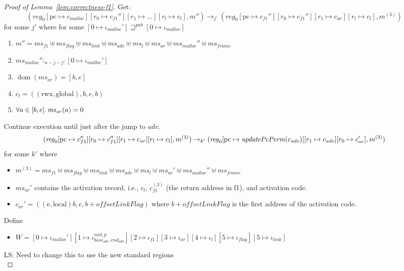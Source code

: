 \documentclass[a4paper]{article}
\newcommand{\update}[2]{[#1 \mapsto #2]}
\DeclareMathOperator{\dom}{dom}
\newcommand\lau[1]{{\color{purple} \sf \footnotesize {LS: #1}}\\}
\newcommand{\var}[1]{\mathit{#1}}
\newcommand{\hs}{\var{ms}}
\newcommand{\ms}{\hs}
\newcommand{\pcreg}{\mathrm{pc}}
\newcommand{\start}{\var{base}}
\newcommand{\addrend}{\var{end}}
\newcommand{\reg}{\var{reg}}
\newcommand{\heap}{\var{mem}}
\newcommand{\adv}{\var{adv}}
\newcommand{\link}{\var{link}}
\newcommand{\flag}{\var{flag}}
\newcommand{\nwl}{\var{nwl}}
\newcommand{\olf}{\var{offsetLinkFlag}}
\newcommand{\plainfun}[2]{
  \ifthenelse{\equal{#2}{}}
  {\mathit{#1}}
  {\mathit{#1}(#2)}
}
\newcommand{\updatePcPerm}[1]{\plainfun{updatePcPerm}{#1}}
\newcommand{\futurewk}{\mathbin{\sqsupseteq}^{\var{pub}}}
\newcommand{\heapSat}[3][\heap]{#1 :_{#2} #3}
\newcommand{\codelabel}[1]{\mathit{#1}}
\newcommand{\malloc}{\codelabel{malloc}}
\newcommand{\plainperm}[1]{\mathrm{#1}}
\newcommand{\entry}{\plainperm{e}}
\newcommand{\rwx}{\plainperm{rwx}}
\newcommand{\local}{\plainperm{local}}
\newcommand{\glob}{\plainperm{global}}
\newcommand{\step}[1][]{\rightarrow_{#1}}
\begin{document}
\begin{proof}[Proof of Lemma~\ref{lem:correctness-f1}]
  Get:
  \[
    (\reg_0\update{\pcreg}{c_\malloc}\update{r_0}{c_{f1}''}\update{r_1}{\dots}\update{r_l}{c_l},m'')
    \step[j']
    (\reg_0\update{\pcreg}{c_{f1}''}\update{r_0}{c_{f1}''}\update{r_1}{c_{\var{ar}}}\update{r_l}{c_l},m^{(3)})
  \]
  for some $j'$ where for some $[0 \mapsto \iota_{\malloc}'] \futurewk [0 \mapsto \iota_{\malloc}]$
  \begin{enumerate}[resume]
  \item $m'' = \hs_{f1} \uplus 
    \hs_\flag \uplus                
    \ms_{\var{link}} \uplus 
    \hs_\adv \uplus 
    \ms_{l} \uplus
    \ms_{\var{ar}} \uplus
    \ms_{\malloc}'' \uplus 
    \hs_{\var{frame}} $
  \item $\heapSat[\ms_{\malloc}'']{n-j-j'}{[0 \mapsto \iota_{\malloc}']}$ \label{f1:mallocsat}
  \item $\dom(\hs_{\var{ar}}) = [b,e]$
  \item $c_l = ((\rwx,\glob),b,e,b)$ \label{test}
  \item $\forall a \in [b,e] \ldotp \ms_{\var{ar}}(a) = 0$
  \end{enumerate}
  Continue execution until just after the jump to $\var{adv}$.
  \[
    (\reg_0\update{\pcreg}{c_{f1}''}\update{r_0}{c_{f1}''}\update{r_1}{c_{\var{ar}}}\update{r_l}{c_l},m^{(3)})
    \step[k']
    (\reg_0\update{\pcreg}{\updatePcPerm{c_{\var{adv}}}}\update{r_1}{c_{\var{adv}}}\update{r_0}{c_{ar}'},m^{(3)})
  \]
  for some $k'$ where
  \begin{itemize}
  \item $m^{(3)} = \hs_{f1} \uplus 
    \hs_\flag \uplus                
    \ms_{\var{link}} \uplus 
    \hs_\adv \uplus 
    \ms_{l} \uplus
    \ms_{\var{ar}}' \uplus
    \ms_{\malloc}'' \uplus 
    \hs_{\var{frame}} $
  \item $\ms_{\var{ar}}'$ contains the activation record, i.e., $c_l$, $c_{f1}^{(3)}$ (the return address in f1), and activation code.
  \item $c_{\var{ar}}' = ((\entry,\local)b,e,b+\olf)$ where $b+\olf$ is the first address of the activation code.
  \end{itemize}
  Define
  \begin{itemize}
  \item $W = [0 \mapsto \iota_\malloc']
    [1 \mapsto \iota^{\nwl,p}_{\start_\adv,\addrend_\adv}]
    [2 \mapsto \iota_{f1}]
    [3 \mapsto \iota_{\var{ar}}]
    [4 \mapsto \iota_l]
    [5 \mapsto \iota_\flag]
    [5 \mapsto \iota_\link]$
  \end{itemize}
  \lau{Need to change this to use the new standard regions}

\end{proof}
\end{document}
